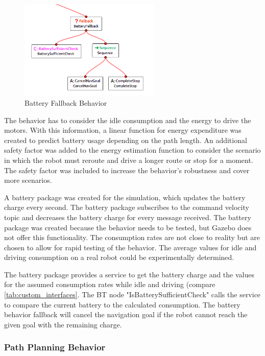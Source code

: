 \begin{figure}[ht]
	\centering
	\includegraphics[width=0.6\textwidth]{images/battery_fallback_inverted.png}
	\caption{Battery Fallback Behavior}
	\label{fig:battery_fallback}
\end{figure}

The behavior has to consider the idle consumption and the energy to drive the motors. With this information, a linear function for energy expenditure was created to predict battery usage depending on the path length. An additional safety factor was added to the energy estimation function to consider the scenario in which the robot must reroute and drive a longer route or stop for a moment. The safety factor was included to increase the behavior's robustness and cover more scenarios.
%

A battery package was created for the simulation, which updates the battery charge every second. The battery package subscribes to the command velocity topic and decreases the battery charge for every message received. The battery package was created because the behavior needs to be tested, but Gazebo does not offer this functionality. The consumption rates are not close to reality but are chosen to allow for rapid testing of the behavior. The average values for idle and driving consumption on a real robot could be experimentally determined. 

The battery package provides a service to get the battery charge and the values for the assumed consumption rates while idle and driving (compare \ref{tab:custom_interfaces}. The BT node "IsBatterySufficientCheck" calls the service to compare the current battery to the calculated consumption. The battery behavior fallback will cancel the navigation goal if the robot cannot reach the given goal with the remaining charge.

\subsubsection{Path Planning Behavior}

